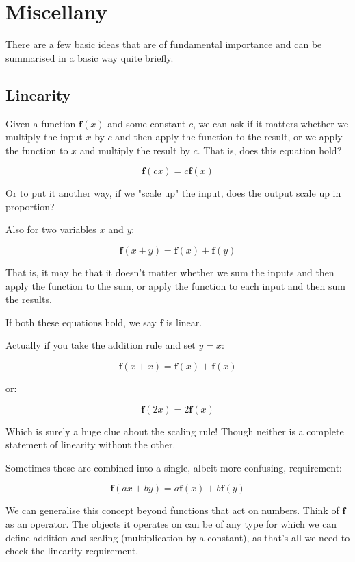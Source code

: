 \chapter{Miscellany}

There are a few basic ideas that are of fundamental importance and can be summarised in a basic way quite briefly.

\section{Linearity} \label{sec:linearity}

Given a function $\mathbf{f}(x)$ and some constant $c$, we can ask if it matters whether we multiply the input $x$ by $c$ and then apply the function to the result, or we apply the function to $x$ and multiply the result by $c$. That is, does this equation hold?

$$\mathbf{f}(cx) = c\mathbf{f}(x)$$

Or to put it another way, if we "scale up" the input, does the output scale up in proportion?

Also for two variables $x$ and $y$:

$$\mathbf{f}(x + y) = \mathbf{f}(x) + \mathbf{f}(y)$$

That is, it may be that it doesn't matter whether we sum the inputs and then apply the function to the sum, or apply the function to each input and then sum the results.

If both these equations hold, we say $\mathbf{f}$ is linear.

Actually if you take the addition rule and set $y = x$:

$$\mathbf{f}(x + x) = \mathbf{f}(x) + \mathbf{f}(x)$$

or:

$$\mathbf{f}(2x) = 2\mathbf{f}(x)$$

Which is surely a huge clue about the scaling rule! Though neither is a complete statement of linearity without the other.

Sometimes these are combined into a single, albeit more confusing, requirement:

$$\mathbf{f}(ax + by) = a\mathbf{f}(x) + b\mathbf{f}(y)$$

We can generalise this concept beyond functions that act on numbers. Think of $\mathbf{f}$ as an operator. The objects it operates on can be of any type for which we can define addition and scaling (multiplication by a constant), as that's all we need to check the linearity requirement.

